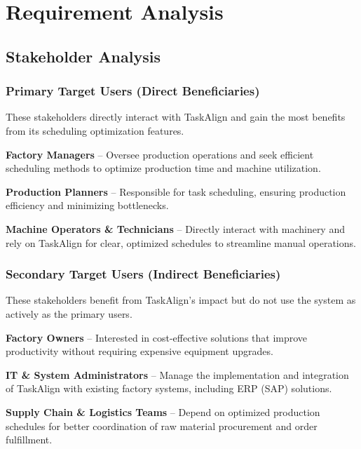 \chapter{Requirement Analysis}
\label{chap:requirement-analysis}

\section{Stakeholder Analysis}
\label{section:stakeholder-analysis}


\subsection{Primary Target Users (Direct Beneficiaries)}
These stakeholders directly interact with TaskAlign and gain the most benefits from its scheduling optimization features.

\textbf{Factory Managers} – Oversee production operations and seek efficient scheduling methods to optimize production time and machine utilization.

\textbf{Production Planners} – Responsible for task scheduling, ensuring production efficiency and minimizing bottlenecks.

\textbf{Machine Operators \& Technicians} – Directly interact with machinery and rely on TaskAlign for clear, optimized schedules to streamline manual operations.

\subsection{Secondary Target Users (Indirect Beneficiaries)}
These stakeholders benefit from TaskAlign’s impact but do not use the system as actively as the primary users.

\textbf{Factory Owners} – Interested in cost-effective solutions that improve productivity without requiring expensive equipment upgrades.

\textbf{IT \& System Administrators} – Manage the implementation and integration of TaskAlign with existing factory systems, including ERP (SAP) solutions.

\textbf{Supply Chain \& Logistics Teams} – Depend on optimized production schedules for better coordination of raw material procurement and order fulfillment.

